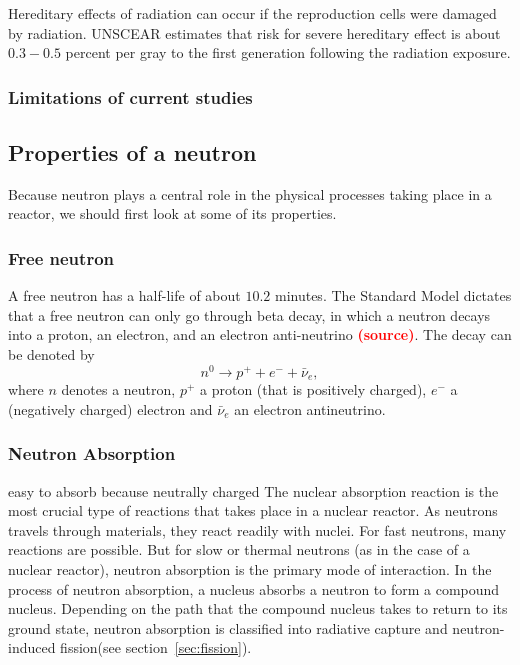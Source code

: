 \documentclass[preprint,aip,pra]{revtex4-1}
\newcommand{\red}[1]{\textcolor{red}{\bf #1}}
\begin{document}
        Hereditary effects of radiation can occur if the reproduction cells were damaged by radiation.
        UNSCEAR estimates that risk for severe hereditary effect is about $0.3-0.5$ percent per gray to
        the first generation following the radiation exposure.\cite{u16, unscear12}

        \subsubsection{Limitations of current studies}
    \subsection{Properties of a neutron}
        Because neutron plays a central role in the physical processes taking
        place in a reactor, we should first look at some of its
        properties.
        \subsubsection{Free neutron}
        A free neutron has a half-life of about $10.2$ minutes. \cite{gc01} The Standard
        Model dictates that a free neutron can only go through beta decay, in which a neutron decays
        into a proton, an electron, and an electron anti-neutrino \red{(source)}. The decay can be denoted by
        \begin{equation}
            n^0 \rightarrow p^+ + e^- + \bar{\nu}_e,
        \end{equation}
        where $n$ denotes a neutron, $p^+$ a proton (that is positively charged), $e^-$ a
        (negatively charged) electron and $\bar{\nu}_e$ an electron antineutrino.

        \subsubsection{Neutron Absorption}
        \label{sec:capture}
        easy to absorb because neutrally charged
        The nuclear absorption reaction is the most crucial type of reactions that takes place in
        a nuclear reactor. As neutrons travels through materials, they react readily with nuclei.
        For fast neutrons, many reactions are possible. But for slow or thermal neutrons (as in the
        case of a nuclear reactor), neutron absorption is the primary mode of interaction.
        In the process of neutron absorption, a nucleus absorbs a neutron to form
        a compound nucleus. Depending on the path that the compound nucleus takes to return to its ground
        state, neutron absorption is classified into radiative capture and neutron-induced
        fission(see section~\ref{sec:fission}).
        
\end{document}
